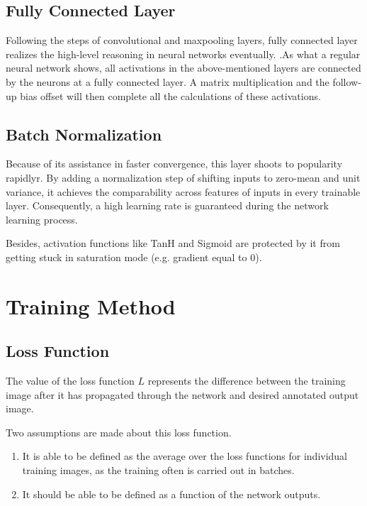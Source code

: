     \subsection{Fully Connected Layer}
    Following the steps of convolutional and maxpooling layers, fully connected layer realizes the high-level reasoning in neural networks eventually. .As what a regular neural network shows, all activations in the above-mentioned layers are connected by the neurons at a fully connected layer. A matrix multiplication and the follow-up bias offset will then complete all the calculations of these activations.

    \subsection{Batch Normalization}
    \label{batchnor}
    Because of its assistance in faster convergence, this layer shoots to popularity rapidlyr\cite{ioffe2015batch}. By adding a normalization step of shifting inputs to zero-mean and unit variance, it achieves the comparability across features of inputs in every trainable layer. Consequently, a high learning rate is guaranteed during the network learning process. 

    Besides, activation functions like TanH and Sigmoid are protected by it from getting stuck in saturation mode (e.g. gradient equal to $0$).

    \section{Training Method}
    \label{training}
    \subsection{Loss Function}
    The value of the loss function $L$ represents the difference between the training image after it has propagated through the network and desired annotated output image.

    Two assumptions are made about this loss function. 
    \begin{enumerate}
        \item It is able to be defined as the average over the loss functions for individual training images, as the training often is carried out in batches.
        \item It should be able to be defined as a function of the network outputs. 
    \end{enumerate}

